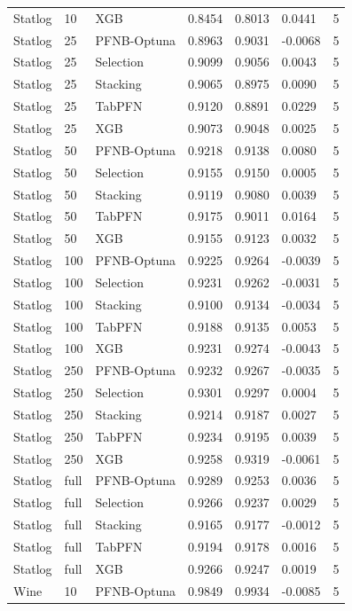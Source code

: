 \begin{tabular}{llllllr}
Statlog & 10 & XGB & 0.8454 & 0.8013 & 0.0441 & 5 \\
Statlog & 25 & PFNB-Optuna & 0.8963 & 0.9031 & -0.0068 & 5 \\
Statlog & 25 & Selection & 0.9099 & 0.9056 & 0.0043 & 5 \\
Statlog & 25 & Stacking & 0.9065 & 0.8975 & 0.0090 & 5 \\
Statlog & 25 & TabPFN & 0.9120 & 0.8891 & 0.0229 & 5 \\
Statlog & 25 & XGB & 0.9073 & 0.9048 & 0.0025 & 5 \\
Statlog & 50 & PFNB-Optuna & 0.9218 & 0.9138 & 0.0080 & 5 \\
Statlog & 50 & Selection & 0.9155 & 0.9150 & 0.0005 & 5 \\
Statlog & 50 & Stacking & 0.9119 & 0.9080 & 0.0039 & 5 \\
Statlog & 50 & TabPFN & 0.9175 & 0.9011 & 0.0164 & 5 \\
Statlog & 50 & XGB & 0.9155 & 0.9123 & 0.0032 & 5 \\
Statlog & 100 & PFNB-Optuna & 0.9225 & 0.9264 & -0.0039 & 5 \\
Statlog & 100 & Selection & 0.9231 & 0.9262 & -0.0031 & 5 \\
Statlog & 100 & Stacking & 0.9100 & 0.9134 & -0.0034 & 5 \\
Statlog & 100 & TabPFN & 0.9188 & 0.9135 & 0.0053 & 5 \\
Statlog & 100 & XGB & 0.9231 & 0.9274 & -0.0043 & 5 \\
Statlog & 250 & PFNB-Optuna & 0.9232 & 0.9267 & -0.0035 & 5 \\
Statlog & 250 & Selection & 0.9301 & 0.9297 & 0.0004 & 5 \\
Statlog & 250 & Stacking & 0.9214 & 0.9187 & 0.0027 & 5 \\
Statlog & 250 & TabPFN & 0.9234 & 0.9195 & 0.0039 & 5 \\
Statlog & 250 & XGB & 0.9258 & 0.9319 & -0.0061 & 5 \\
Statlog & full & PFNB-Optuna & 0.9289 & 0.9253 & 0.0036 & 5 \\
Statlog & full & Selection & 0.9266 & 0.9237 & 0.0029 & 5 \\
Statlog & full & Stacking & 0.9165 & 0.9177 & -0.0012 & 5 \\
Statlog & full & TabPFN & 0.9194 & 0.9178 & 0.0016 & 5 \\
Statlog & full & XGB & 0.9266 & 0.9247 & 0.0019 & 5 \\
Wine & 10 & PFNB-Optuna & 0.9849 & 0.9934 & -0.0085 & 5 \\

\end{tabular}

